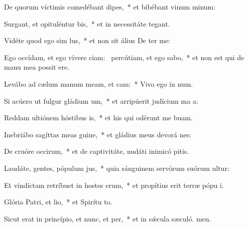 \item De quorum víctimis comedébant dipes,~* et bibébant vinum minum:
\item Surgant, et opituléntur bis,~* et in necessitáte  tegant.
\item Vidéte quod ego sim lus,~* et non sit álius De ter me:
\item Ego occídam, et ego vívere ciam:~\pscross{} percútiam, et ego sabo,~* et non est qui de manu mea possit ere.
\item Levábo ad cælum manum meam, et cam:~* Vivo ego in num.
\item Si acúero ut fulgur gládium um,~* et arripúerit judícium ma a:
\item Reddam ultiónem hóstibus is,~* et his qui odérunt me buam.
\item Inebriábo sagíttas meas guine,~* et gládius meus devorá nes:
\item De cruóre occirum,~* et de captivitáte, nudáti inimicó pitis.
\item Laudáte, gentes, pópulum jus,~* quia sánguinem servórum suórum ultur:
\item Et vindíctam retríbuet in hostes erum,~* et propítius erit terræ pópu i.
\item \singlecolsep
\item Glória Patri, et lio,~* et Spirítu to.
\item Sicut erat in princípio, et nunc, et per,~* et in sǽcula sæculó. men.
